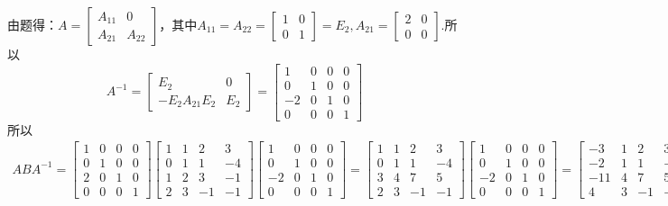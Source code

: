\documentclass{article}
\begin{document}
\begin{jie}
由题得：$A=
\begin{bmatrix}
  A_{11} & 0 \\
   A_{21}& A_{22}
\end{bmatrix}
$，其中$A_{11}=A_{22}=
\begin{bmatrix}
  1 & 0 \\
  0 & 1
\end{bmatrix}=E_{2}
,A_{21}=
\begin{bmatrix}
  2 & 0 \\
  0 & 0
\end{bmatrix}
$.所以
\begin{equation*}
  A^{-1}=
  \begin{bmatrix}
    E_{2} & 0 \\
    -E_{2}A_{21}E_{2} & E_{2}
  \end{bmatrix}=
  \begin{bmatrix}
    1 & 0 & 0 & 0\\
  0 & 1 & 0 & 0\\
  -2 & 0 & 1 & 0\\
  0 & 0 & 0 & 1
  \end{bmatrix}
\end{equation*}
所以
\begin{align*}
ABA^{-1}=\begin{bmatrix}
  1 & 0 & 0 & 0\\
  0 & 1 & 0 & 0\\
  2 & 0 & 1 & 0\\
  0 & 0 & 0 & 1
\end{bmatrix}
\begin{bmatrix}
  1 & 1 & 2 & 3\\
  0 & 1 & 1 & -4\\
  1 & 2 & 3 & -1\\
  2 & 3 & -1 & -1
\end{bmatrix}
  \begin{bmatrix}
    1 & 0 & 0 & 0\\
  0 & 1 & 0 & 0\\
  -2 & 0 & 1 & 0\\
  0 & 0 & 0 & 1
  \end{bmatrix}=\begin{bmatrix}
  1 & 1 & 2 & 3\\
  0 & 1 & 1 & -4\\
  3 & 4 & 7 & 5\\
  2 & 3 & -1 & -1
\end{bmatrix}
  \begin{bmatrix}
    1 & 0 & 0 & 0\\
  0 & 1 & 0 & 0\\
  -2 & 0 & 1 & 0\\
  0 & 0 & 0 & 1
  \end{bmatrix}=\begin{bmatrix}
  -3 & 1 & 2 & 3\\
  -2 & 1 & 1 & -4\\
  -11 & 4 & 7 & 5\\
  4 & 3 & -1 & -1
\end{bmatrix}
\end{align*}
\end{jie}
\end{document}
